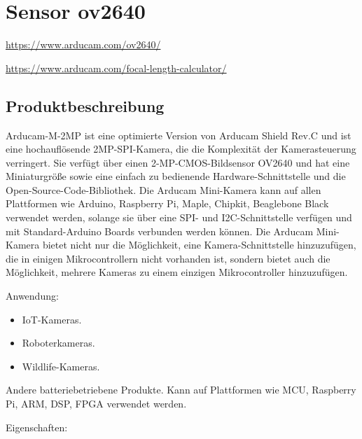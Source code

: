 %
%
%

\chapter{Sensor ov2640}

\url{https://www.arducam.com/ov2640/}

\url{https://www.arducam.com/focal-length-calculator/}

\section{Produktbeschreibung}

Arducam-M-2MP ist eine optimierte Version von Arducam Shield Rev.C und ist eine hochauflösende 2MP-SPI-Kamera, die die Komplexität der Kamerasteuerung verringert. Sie verfügt über einen 2-MP-CMOS-Bildsensor OV2640 und hat eine Miniaturgröße sowie eine einfach zu bedienende Hardware-Schnittstelle und die Open-Source-Code-Bibliothek. Die Arducam Mini-Kamera kann auf allen Plattformen wie Arduino, Raspberry Pi, Maple, Chipkit, Beaglebone Black verwendet werden, solange sie über eine SPI- und I2C-Schnittstelle verfügen und mit Standard-Arduino Boards verbunden werden können. Die Arducam Mini-Kamera bietet nicht nur die Möglichkeit, eine Kamera-Schnittstelle hinzuzufügen, die in einigen Mikrocontrollern nicht vorhanden ist, sondern bietet auch die Möglichkeit, mehrere Kameras zu einem einzigen Mikrocontroller hinzuzufügen.

\bigskip

Anwendung:
\begin{itemize}
  \item IoT-Kameras.
  \item Roboterkameras.
  \item Wildlife-Kameras.
\end{itemize}

Andere batteriebetriebene Produkte.
Kann auf Plattformen wie MCU, Raspberry Pi, ARM, DSP, FPGA verwendet werden.

\bigskip

Eigenschaften:

